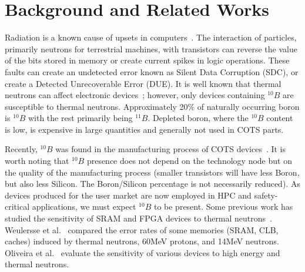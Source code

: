 \section{Background and Related Works}
\label{sec_background}

%

Radiation is a known cause of upsets in computers~\cite{Jedec2006}. The interaction of particles, primarily neutrons for terrestrial machines, with transistors can reverse the value of the bits stored in memory or create current spikes in logic operations. These faults can create an undetected error known as Silent Data Corruption (SDC), or create a Detected Unrecoverable Error (DUE). It is well known that thermal neutrons can affect electronic devices~\cite{Baumann2005, ziegler2003}; however, only devices containing $^{10}B$ are susceptible to thermal neutrons. 
Approximately 20\% of naturally occurring boron is $^{10}B$ with the rest primarily being $^{11}B$. Depleted boron, where the $^{10}B$ content is low, is expensive in large quantities and generally not used in COTS parts. %

Recently, $^{10}B$ was found in the manufacturing process of COTS devices~\cite{wen2010b10}. It is worth noting that $^{10}B$ presence does not depend on the technology node but on the quality of the manufacturing process (smaller transistors will have less Boron, but also less Silicon. The Boron/Silicon percentage is not necessarily reduced). As devices produced for the user market are now employed in HPC and safety-critical applications, we must expect $^{10}B$ to be present. 
Some previous work has studied the sensitivity of SRAM and FPGA devices to thermal neutrons~\cite{lee2015radiation,fang2016characterization}. Weulersse et al.~\cite{weulersse2018contribution} compared the error rates of some memories (SRAM, CLB, caches) induced by thermal neutrons, 60MeV protons, and 14MeV neutrons. Oliveira et al.~\cite{8975983} evaluate the sensitivity of various devices to high energy and thermal neutrons.

